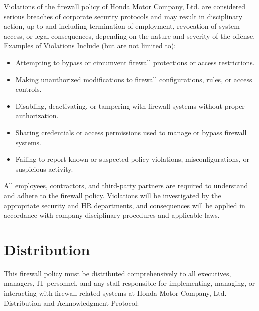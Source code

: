 Violations of the firewall policy of Honda Motor Company, Ltd. are considered serious breaches of corporate security protocols and may result in disciplinary action, up to and including termination of employment, revocation of system access, or legal consequences, depending on the nature and severity of the offense. Examples of Violations Include (but are not limited to):
\begin{itemize}
    \item Attempting to bypass or circumvent firewall protections or access restrictions.
    
    \item Making unauthorized modifications to firewall configurations, rules, or access controls.
    
    \item Disabling, deactivating, or tampering with firewall systems without proper authorization.

    \item Sharing credentials or access permissions used to manage or bypass firewall systems.
    
    \item Failing to report known or suspected policy violations, misconfigurations, or suspicious activity.
\end{itemize}
All employees, contractors, and third-party partners are required to understand and adhere to the firewall policy. Violations will be investigated by the appropriate security and HR departments, and consequences will be applied in accordance with company disciplinary procedures and applicable laws.

\section{Distribution}

This firewall policy must be distributed comprehensively to all executives, managers, IT personnel, and any staff responsible for implementing, managing, or interacting with firewall-related systems at Honda Motor Company, Ltd. Distribution and Acknowledgment Protocol:

